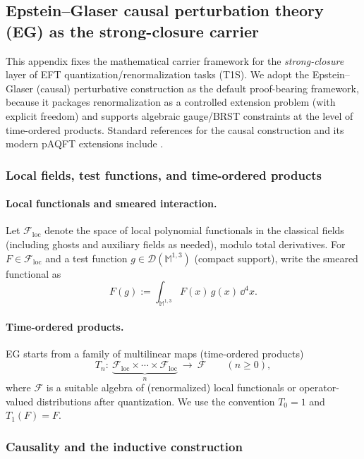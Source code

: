 \subsection{Epstein--Glaser causal perturbation theory (EG) as the strong-closure carrier}
\label{app:eg_causal_perturbation_framework}

\AuditTag This appendix fixes the mathematical carrier framework for the \emph{strong-closure} layer of EFT quantization/renormalization tasks (T1S).
We adopt the Epstein--Glaser (causal) perturbative construction as the default proof-bearing framework, because it packages renormalization as a controlled extension problem (with explicit freedom) and supports algebraic gauge/BRST constraints at the level of time-ordered products.
Standard references for the causal construction and its modern pAQFT extensions include \cite{EpsteinGlaser1973,BrunettiFredenhagen2000Microlocal,Dutsch2019pAQFT}.

\subsubsection{Local fields, test functions, and time-ordered products}
\paragraph{Local functionals and smeared interaction.}
Let $\mathcal{F}_{\mathrm{loc}}$ denote the space of local polynomial functionals in the classical fields (including ghosts and auxiliary fields as needed), modulo total derivatives.
For $F\in \mathcal{F}_{\mathrm{loc}}$ and a test function $g\in \mathcal{D}(\mathbb{M}^{1,3})$ (compact support), write the smeared functional as
\[
F(g):=\int_{\mathbb{M}^{1,3}} F(x)\,g(x)\,\dd^4 x.
\]

\paragraph{Time-ordered products.}
EG starts from a family of multilinear maps (time-ordered products)
\[
T_n:\ \underbrace{\mathcal{F}_{\mathrm{loc}}\times\cdots\times\mathcal{F}_{\mathrm{loc}}}_{n}\ \longrightarrow\ \mathcal{F}
\qquad (n\ge 0),
\]
where $\mathcal{F}$ is a suitable algebra of (renormalized) local functionals or operator-valued distributions after quantization.
We use the convention $T_0=1$ and $T_1(F)=F$.

\subsubsection{Causality and the inductive construction}
